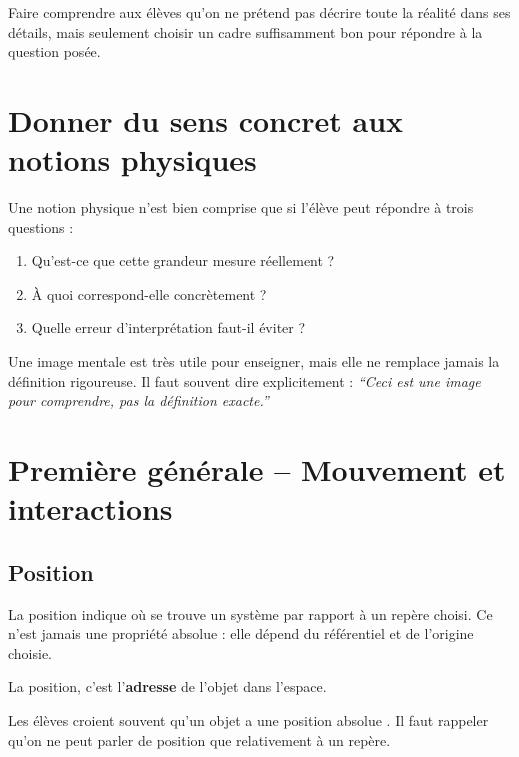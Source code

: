 \documentclass[11pt,a4paper]{article}
\begin{document}
\begin{idee}
Faire comprendre aux élèves qu'on ne prétend pas décrire toute la réalité dans ses détails,
mais seulement choisir un cadre suffisamment bon pour répondre à la question posée.
\end{idee}

\section{Donner du sens concret aux notions physiques}

Une notion physique n'est bien comprise que si l'élève peut répondre à trois questions :
\begin{enumerate}
    \item Qu'est-ce que cette grandeur mesure réellement ?
    \item À quoi correspond-elle concrètement ?
    \item Quelle erreur d'interprétation faut-il éviter ?
\end{enumerate}

\begin{idee}
Une image mentale est très utile pour enseigner, mais elle ne remplace jamais la définition rigoureuse.
Il faut souvent dire explicitement :
\textit{``Ceci est une image pour comprendre, pas la définition exacte.''}
\end{idee}

\newpage

\section{Première générale -- Mouvement et interactions}

\subsection{Position}

\begin{sens}
La position indique où se trouve un système par rapport à un repère choisi.
Ce n'est jamais une propriété absolue : elle dépend du référentiel et de l'origine choisie.
\end{sens}

\begin{imagem}
La position, c'est l'\textbf{adresse} de l'objet dans l'espace.
\end{imagem}

\begin{fausseintuition}
Les élèves croient souvent qu'un objet a une position \og absolue \fg.
Il faut rappeler qu'on ne peut parler de position que relativement à un repère.
\end{fausseintuition}
\end{document}
